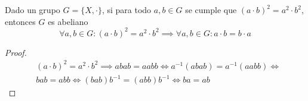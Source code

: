 \begin{thm}
    Dado un grupo $G = \{X, \cdot\}$, si para todo $a,b \in G$ se cumple que $(a\cdot b)^2 = a^2 \cdot b^2$, entonces $G$ es abeliano
    \begin{equation}
        \forall a,b \in G: (a\cdot b)^2 = a^2 \cdot b^2 \implies \forall a,b \in G: a \cdot b = b \cdot a
    \end{equation}
\end{thm}

\begin{proof}
    \begin{equation}
        \begin{split}
        & (a \cdot b)^2 = a^2 \cdot b^2 \implies abab = aabb \iff a^{-1}(abab) = a^{-1}(aabb) \iff\\
        & bab = abb \iff (bab)b^{-1} = (abb)b^{-1} \iff ba = ab  
        \end{split}
    \end{equation}
\end{proof}
